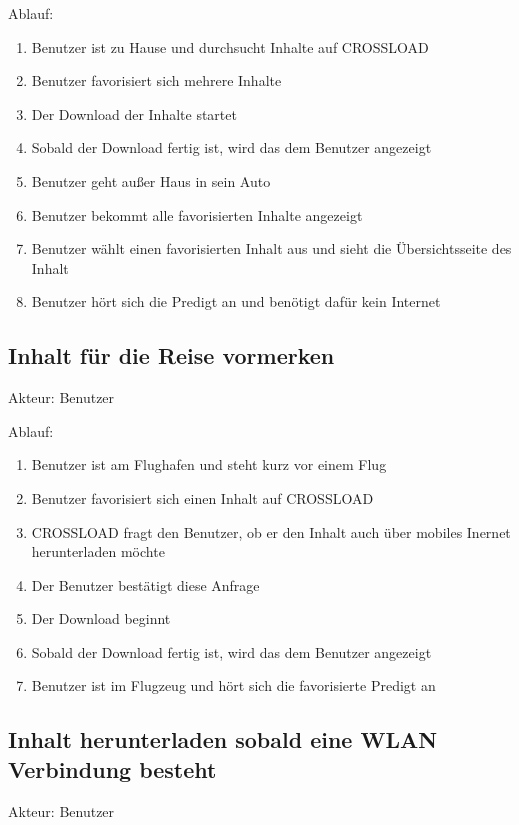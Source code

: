 Ablauf:
\begin{enumerate}
	\item Benutzer ist zu Hause und durchsucht Inhalte auf CROSSLOAD
	\item Benutzer favorisiert sich mehrere Inhalte
	\item Der Download der Inhalte startet
	\item Sobald der Download fertig ist, wird das dem Benutzer angezeigt
	\item Benutzer geht außer Haus in sein Auto
	\item Benutzer bekommt alle favorisierten Inhalte angezeigt
	\item Benutzer wählt einen favorisierten Inhalt aus und sieht die Übersichtsseite des Inhalt
	\item Benutzer hört sich die Predigt an und benötigt dafür kein Internet
\end{enumerate}

\subsection{Inhalt für die Reise vormerken}
Akteur: Benutzer

Ablauf:
\begin{enumerate}
	\item Benutzer ist am Flughafen und steht kurz vor einem Flug
	\item Benutzer favorisiert sich einen Inhalt auf CROSSLOAD
	\item CROSSLOAD fragt den Benutzer, ob er den Inhalt auch über mobiles Inernet herunterladen möchte
	\item Der Benutzer bestätigt diese Anfrage
	\item Der Download beginnt
	\item Sobald der Download fertig ist, wird das dem Benutzer angezeigt
	\item Benutzer ist im Flugzeug und hört sich die favorisierte Predigt an
\end{enumerate}

\subsection{Inhalt herunterladen sobald eine WLAN Verbindung besteht}
Akteur: Benutzer

